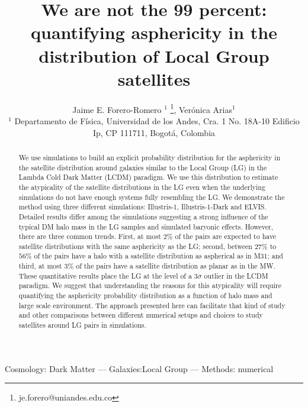 \documentclass[a4paper,fleqn,usenatbib]{mnras}
\begin{document}
\title[LG satellites distribution asphericity]{We are not the 99 percent: quantifying
  asphericity in the distribution of Local Group satellites}
\author[J.E. Forero-Romero \& V. Arias]
{Jaime E. Forero-Romero $^{1}$ \thanks{je.forero@uniandes.edu.co},
Ver\'onica Arias$^1$\\
$^1$ Departamento de F\'isica, Universidad de los Andes, Cra. 1
  No. 18A-10 Edificio Ip, CP 111711, Bogot\'a, Colombia \\
}

\maketitle

\begin{abstract}
We use simulations to build an explicit probability distribution for
the asphericity in the satellite distribution around galaxies similar
to the Local Group (LG) in the Lambda Cold Dark Matter (LCDM) paradigm. 
We use this distribution to estimate the  atypicality
of the satellite distributions in the LG even when the underlying
simulations do not have enough systems fully resembling the LG.
We demonstrate the method using three different simulations:
Illustris-1,  Illustris-1-Dark and ELVIS. 
Detailed results differ among the simulations suggesting a strong
influence of the typical DM halo mass in the LG samples and simulated
baryonic effects. 
However, there are three common trends.
First, at most $2\%$ of the pairs are expected to have satellite
distributions with the same asphericity as the LG; second,
between $27\%$ to $56\%$ of the pairs have a halo with a satellite
distribution as aspherical as in M31; and third, at most $3\%$ of the
pairs have a satellite distribution as planar as in the MW. 
These quantitative results place the LG at the level of a $3\sigma$
outlier in the LCDM paradigm. 
We suggest that understanding the reasons for this atypicality
will require quantifying the asphericity probability distribution as a
function of halo mass and large scale environment.
The approach presented here can facilitate that kind of study and other
comparisons between different numerical setups and choices to study
satellites around LG pairs in simulations.  
\end{abstract}

\begin{keywords}Cosmology: Dark Matter --- Galaxies:Local Group ---
  Methods: numerical  
\end{keywords}
\end{document}

